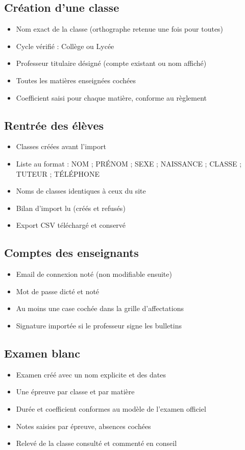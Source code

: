 \documentclass[11pt,a4paper]{article}
\begin{document}
\subsection*{Création d'une classe}
\begin{itemize}[label=$\square$]
  \item Nom exact de la classe (orthographe retenue une fois pour toutes)
  \item Cycle vérifié : Collège ou Lycée
  \item Professeur titulaire désigné (compte existant ou nom affiché)
  \item Toutes les matières enseignées cochées
  \item Coefficient saisi pour chaque matière, conforme au règlement
\end{itemize}

\subsection*{Rentrée des élèves}
\begin{itemize}[label=$\square$]
  \item Classes créées avant l'import
  \item Liste au format : NOM ; PRÉNOM ; SEXE ; NAISSANCE ; CLASSE ; TUTEUR ; TÉLÉPHONE
  \item Noms de classes identiques à ceux du site
  \item Bilan d'import lu (créés et refusés)
  \item Export CSV téléchargé et conservé
\end{itemize}

\subsection*{Comptes des enseignants}
\begin{itemize}[label=$\square$]
  \item Email de connexion noté (non modifiable ensuite)
  \item Mot de passe dicté et noté
  \item Au moins une case cochée dans la grille d'affectations
  \item Signature importée si le professeur signe les bulletins
\end{itemize}

\subsection*{Examen blanc}
\begin{itemize}[label=$\square$]
  \item Examen créé avec un nom explicite et des dates
  \item Une épreuve par classe et par matière
  \item Durée et coefficient conformes au modèle de l'examen officiel
  \item Notes saisies par épreuve, absences cochées
  \item Relevé de la classe consulté et commenté en conseil
\end{itemize}
\end{document}
